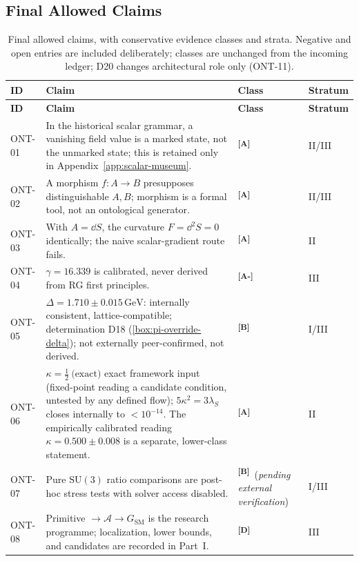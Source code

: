 \documentclass[12pt,a4paper,twoside]{article}
\theoremstyle{plain}
\theoremstyle{definition}
\theoremstyle{remark}
\newcommand{\GeV}{\,\mathrm{GeV}}
\newcommand{\catmark}[1]{\textsuperscript{\textsf{\textbf{[#1]}}}}
\newcommand{\DeltaGap}{1.710 \pm 0.015\GeV} %
\newcommand{\GammaGeom}{16.339} %
\newcommand{\KappaRG}{\tfrac{1}{2}\ \text{(exact)}} %
\begin{document}
\subsection{Final Allowed Claims}
\label{sec:final-claims}

{\small
\renewcommand{\arraystretch}{1.3}
\begin{longtable}{p{} p{} p{} p{}}
\caption{Final allowed claims, with conservative evidence classes and
strata. Negative and open entries are included deliberately; classes are
unchanged from the incoming ledger; D20 changes architectural role only (ONT-11).}
\label{tab:claims}\\
\toprule
\textbf{ID} & \textbf{Claim} & \textbf{Class} & \textbf{Stratum} \\
\midrule
\endfirsthead
\toprule
\textbf{ID} & \textbf{Claim} & \textbf{Class} & \textbf{Stratum} \\
\midrule
\endhead
\bottomrule
\endfoot
ONT-01 & In the historical scalar grammar, a vanishing field value is a marked state, not the unmarked state; this is retained only in Appendix~\ref{app:scalar-museum}. & \catmark{A} & II/III \\
ONT-02 & A morphism $f\colon A\to B$ presupposes distinguishable $A,B$; morphism is a formal tool, not an ontological generator. & \catmark{A} & II/III \\
ONT-03 & With $A=\dd S$, the curvature $F=\dd^2 S=0$ identically; the naive scalar-gradient route fails. & \catmark{A} & II \\
ONT-04 & $\gamma = \GammaGeom$ is calibrated, never derived from RG first principles. & \catmark{A-} & III \\
ONT-05 & $\Delta = \DeltaGap$: internally consistent, lattice-compatible; determination D18 (\cref{box:pi-override-delta}); not externally peer-confirmed, not derived. & \catmark{B} & I/III \\
ONT-06 & $\kappa = \KappaRG$ exact framework input (fixed-point reading a candidate condition, untested by any defined flow); $5\kappa^2 = 3\lambda_S$ closes internally to $<10^{-14}$. The empirically calibrated reading $\kappa = 0.500 \pm 0.008$ is a separate, lower-class statement. & \catmark{A} & II \\
ONT-07 & Pure $\mathrm{SU}(3)$ ratio comparisons are post-hoc stress tests with solver access disabled. & \catmark{B}\ (\emph{pending external verification}) & I/III \\
ONT-08 & Primitive $\to\mathcal{A}\to G_{\mathrm{SM}}$ is the research programme; localization, lower bounds, and candidates are recorded in Part~I. & \catmark{D} & III \\

\end{longtable}}
\end{document}
